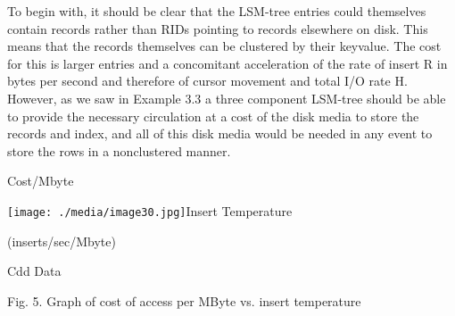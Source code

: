 \documentclass[a4paper,12pt,notitlepage,twoside,openright]{article}
\begin{document}
To begin with, it should be clear that the LSM-tree entries could
themselves contain records rather than RIDs pointing to records
elsewhere on disk. This means that the records themselves can be
clustered by their keyvalue. The cost for this is larger entries and a
concomitant acceleration of the rate of insert R in bytes per second and
therefore of cursor movement and total I/O rate H. However, as we saw in
Example 3.3 a three component LSM-tree should be able to provide the
necessary circulation at a cost of the disk media to store the records
and index, and all of this disk media would be needed in any event to
store the rows in a nonclustered manner.

Cost/Mbyte

\texttt{[image: ./media/image30.jpg]}Insert
Temperature

(inserts/sec/Mbyte)

Cdd Data

Fig. 5. Graph of cost of access per MByte vs. insert temperature
\end{document}
